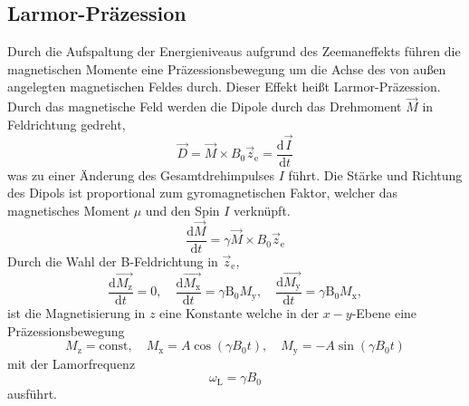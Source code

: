 \subsection{Larmor-Präzession}%
\label{sub:larmor_praezession}
Durch die Aufspaltung der Energieniveaus aufgrund des Zeemaneffekts führen
die magnetischen Momente eine Präzessionsbewegung um die Achse des von außen
angelegten magnetischen Feldes durch.
Dieser Effekt heißt Larmor-Präzession.
Durch das magnetische Feld werden die Dipole durch das Drehmoment $\vec{M}$ in
Feldrichtung gedreht,
\begin{equation}
		\label{eq:dreh}
		\vec{D} = \vec{M} \times B_0 \vec{z}_\text{e} = \frac{\text{d} \vec{I}}{\text{d}t}
\end{equation}
was zu einer Änderung des Gesamtdrehimpulses $I$ führt.
Die Stärke und Richtung des Dipols ist proportional zum gyromagnetischen Faktor,
welcher das magnetisches Moment $\mu$ und den Spin $I$ verknüpft.
\begin{equation}
		\label{eq:dreh}
		\frac{\text{d} \vec{M}}{\text{d}t} = \gamma \vec{M} \times B_0
		\vec{z}_\text{e}
\end{equation}
Durch die Wahl der B-Feldrichtung in $\vec{z}_\text{e}$,
\begin{equation}
		\label{eq:ablM}
		\frac{\text{d} \vec{M_\text{z}}}{\text{d}t} = 0 ,  \hspace{1em}
		\frac{\text{d} \vec{M_\text{x}}}{\text{d}t} = \gamma \text{B}_0
		M_\text{y}, \hspace{1em}
		\frac{\text{d} \vec{M_\text{y}}}{\text{d}t} = \gamma \text{B}_0
		M_\text{x},
\end{equation}
 ist die Magnetisierung in $z$ eine Konstante welche in der $x-y$-Ebene
 eine Präzessionsbewegung
\begin{equation}
		\label{eq:schwM}
		M_\text{z} = \text{const}, \hspace{1em} M_\text{x} = A \cos(\gamma B_0
		t ), \hspace{1em} M_\text{y} = -A \sin(\gamma B_0 t)
\end{equation}
mit der Lamorfrequenz
\begin{equation}
		\label{eq:larmorf}
		\omega_\text{L} = \gamma B_0
\end{equation}
ausführt.

